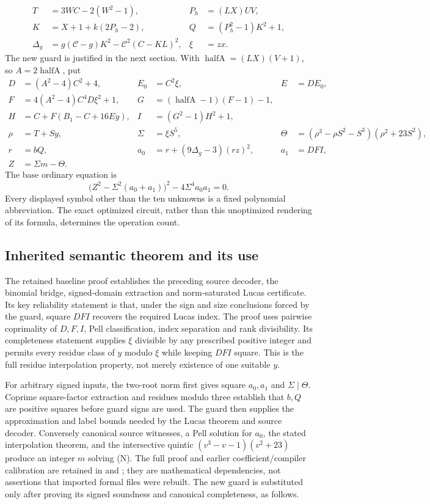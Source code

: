 \documentclass[11pt]{article}
\begin{document}
\begin{align*}
 T&=3WC-2(W^2-1),&P_h&=(LX)UV,\\
 K&=X+1+k(2P_h-2),&Q&=(P_h^2-1)K^2+1,\\
 \Delta_g&=g(\mathcal C-g)K^2-\mathcal C^2(C-KL)^2,&\xi&=zx.
\end{align*}
The new guard is justified in the next section. With
$\operatorname{halfA}=(LX)(V+1)$, so $A=2\operatorname{halfA}$, put
\begin{align*}
 D&=(A^2-4)C^2+4,&E_0&=C^2\xi,&E&=DE_0,\\
 F&=4(A^2-4)C^4D\xi^2+1,&G&=(\operatorname{halfA}-1)(F-1)-1,\\
 H&=C+F(B_1-C+16Ey),&I&=(G^2-1)H^2+1,\\
 \rho&=T+Sy,&\Sigma&=\xi S^5,&
 \Theta&=(\rho^3-\rho S^2-S^3)(\rho^2+23S^2),\\
 r&=bQ,&a_0&=r+(9\Delta_g-3)(rz)^2,&a_1&=DFI,\\
 Z&=\Sigma m-\Theta.
\end{align*}
The base ordinary equation is
\[
 \bigl(Z^2-\Sigma^2(a_0+a_1)\bigr)^2-4\Sigma^4a_0a_1=0.
 \tag{N}
\]
Every displayed symbol other than the ten unknowns is a fixed polynomial
abbreviation. The exact optimized circuit, rather than this unoptimized
rendering of its formula, determines the operation count.

\subsection{Inherited semantic theorem and its use}
The retained baseline proof establishes the preceding source decoder,
the binomial bridge, signed-domain extraction and norm-saturated Lucas
certificate. Its key reliability statement is that, under the sign and
size conclusions forced by the guard, square $DFI$ recovers the required
Lucas index. The proof uses pairwise coprimality of $D,F,I$, Pell
classification, index separation and rank divisibility. Its completeness
statement supplies $\xi$ divisible by any prescribed positive integer and
permits every residue class of $y$ modulo $\xi$ while keeping $DFI$ square.
This is the full residue interpolation property, not merely existence of
one suitable $y$.

For arbitrary signed inputs, the two-root norm first gives square $a_0,a_1$
and $\Sigma\mid\Theta$. Coprime square-factor extraction and residues modulo
three establish that $b,Q$ are positive squares before guard signs are used.
The guard then supplies the approximation and label bounds needed by the
Lucas theorem and source decoder. Conversely canonical source witnesses,
a Pell solution for $a_0$, the stated interpolation theorem, and the
intersective quintic $(v^3-v-1)(v^2+23)$ produce an integer $m$ solving (N).
The full proof and earlier coefficient/compiler calibration are retained in
 and ; they are
mathematical dependencies, not assertions that imported formal files were
rebuilt. The new guard is substituted only after proving its signed
soundness and canonical completeness, as follows.
\end{document}
